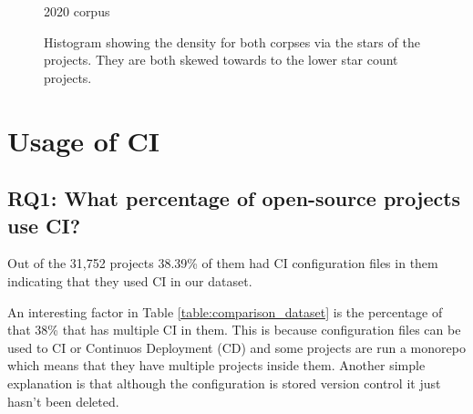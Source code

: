 \documentclass[10pt,conference]{IEEEtran}
\begin{document}
\begin{figure}[!htbp]
\begin{minipage}{.48\textwidth}
  \caption[]{2020 corpus}
  \label{graph:hist2020}
  \end{minipage}
  \caption[]{Histogram showing the density for both corpses via the stars of the projects. They are both skewed towards to the lower star count projects. }
  \label{graph:hist}

\end{figure}




\pagebreak
\section{Usage of CI}

\vspace*{-0.05in}
\subsection{\textbf{RQ1}: What percentage of open-source projects use CI?}
\label{section:RQ1}
\vspace*{-0.05in}

Out of the 31,752 projects 38.39\% of them had CI configuration files in them indicating that they used CI in our dataset. 


An interesting factor in Table \ref{table:comparison_dataset} is the percentage of that 38\% that has multiple CI in them. This is because configuration files can be used to CI or Continuos Deployment (CD) and some projects are run a monorepo which means that they have multiple projects inside them. Another simple explanation is that although the configuration is stored version control it just hasn't been deleted. 
\end{document}
